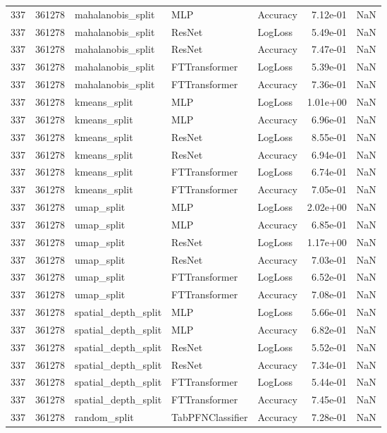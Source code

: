 \begin{tabular}{rrlllrr}
337 & 361278 & mahalanobis\_split & MLP & Accuracy & 7.12e-01 & NaN \\
337 & 361278 & mahalanobis\_split & ResNet & LogLoss & 5.49e-01 & NaN \\
337 & 361278 & mahalanobis\_split & ResNet & Accuracy & 7.47e-01 & NaN \\
337 & 361278 & mahalanobis\_split & FTTransformer & LogLoss & 5.39e-01 & NaN \\
337 & 361278 & mahalanobis\_split & FTTransformer & Accuracy & 7.36e-01 & NaN \\
337 & 361278 & kmeans\_split & MLP & LogLoss & 1.01e+00 & NaN \\
337 & 361278 & kmeans\_split & MLP & Accuracy & 6.96e-01 & NaN \\
337 & 361278 & kmeans\_split & ResNet & LogLoss & 8.55e-01 & NaN \\
337 & 361278 & kmeans\_split & ResNet & Accuracy & 6.94e-01 & NaN \\
337 & 361278 & kmeans\_split & FTTransformer & LogLoss & 6.74e-01 & NaN \\
337 & 361278 & kmeans\_split & FTTransformer & Accuracy & 7.05e-01 & NaN \\
337 & 361278 & umap\_split & MLP & LogLoss & 2.02e+00 & NaN \\
337 & 361278 & umap\_split & MLP & Accuracy & 6.85e-01 & NaN \\
337 & 361278 & umap\_split & ResNet & LogLoss & 1.17e+00 & NaN \\
337 & 361278 & umap\_split & ResNet & Accuracy & 7.03e-01 & NaN \\
337 & 361278 & umap\_split & FTTransformer & LogLoss & 6.52e-01 & NaN \\
337 & 361278 & umap\_split & FTTransformer & Accuracy & 7.08e-01 & NaN \\
337 & 361278 & spatial\_depth\_split & MLP & LogLoss & 5.66e-01 & NaN \\
337 & 361278 & spatial\_depth\_split & MLP & Accuracy & 6.82e-01 & NaN \\
337 & 361278 & spatial\_depth\_split & ResNet & LogLoss & 5.52e-01 & NaN \\
337 & 361278 & spatial\_depth\_split & ResNet & Accuracy & 7.34e-01 & NaN \\
337 & 361278 & spatial\_depth\_split & FTTransformer & LogLoss & 5.44e-01 & NaN \\
337 & 361278 & spatial\_depth\_split & FTTransformer & Accuracy & 7.45e-01 & NaN \\
337 & 361278 & random\_split & TabPFNClassifier & Accuracy & 7.28e-01 & NaN \\

\end{tabular}
